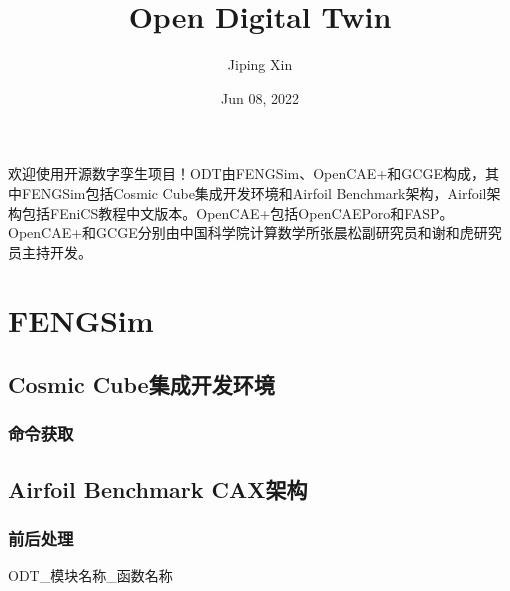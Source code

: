 \documentclass[letterpaper,10pt,english]{sphinxmanual}
\title{Open Digital Twin}
\date{Jun 08, 2022}
\author{Jiping Xin}
\let\sphinxpxdimen\pdfpxdimen\else\newdimen\sphinxpxdimen
\begin{document}
\pagestyle{empty}
\sphinxmaketitle
\pagestyle{plain}
\sphinxtableofcontents
\pagestyle{normal}
\label{\detokenize{index::doc}}
\sphinxstepscope



\sphinxAtStartPar
欢迎使用开源数字孪生项目！ODT由FENGSim、OpenCAE+和GCGE构成，其中FENGSim包括Cosmic Cube集成开发环境和Airfoil Benchmark架构，Airfoil架构包括FEniCS教程中文版本。OpenCAE+包括OpenCAEPoro和FASP。OpenCAE+和GCGE分别由中国科学院计算数学所张晨松副研究员和谢和虎研究员主持开发。

\sphinxstepscope


\chapter{FENGSim}
\label{\detokenize{src/fengsim/main:fengsim}}\label{\detokenize{src/fengsim/main::doc}}
\sphinxstepscope


\section{Cosmic Cube集成开发环境}
\label{\detokenize{src/fengsim/cosmiccube:cosmic-cube}}\label{\detokenize{src/fengsim/cosmiccube::doc}}

\subsection{命令获取}
\label{\detokenize{src/fengsim/cosmiccube:id1}}
\begin{sphinxVerbatim}[commandchars=\\\{\}]
  
\end{sphinxVerbatim}

\noindent\sphinxincludegraphics[width=400\sphinxpxdimen]{{cosmiccube}.jpg}

\sphinxstepscope


\section{Airfoil Benchmark CAX架构}
\label{\detokenize{src/fengsim/airfoil:airfoil-benchmark-cax}}\label{\detokenize{src/fengsim/airfoil::doc}}

\subsection{前后处理}
\label{\detokenize{src/fengsim/airfoil:id1}}
\sphinxAtStartPar
ODT\_模块名称\_函数名称
\end{document}
